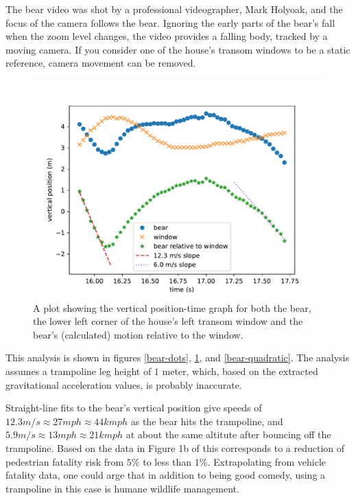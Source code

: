 \documentclass[12pt]{iopart}
\begin{document}
The bear video was shot by a professional videographer, Mark Holyoak, and the focus of the camera follows the bear.  Ignoring the early parts of the bear's fall when the zoom level changes, the video provides a falling body, tracked by a moving camera.  If you consider one of the house's transom windows to be a static reference, camera movement can be removed.

\begin{figure}[ht]
\centering
\includegraphics[width=\columnwidth]{figure_7_bear-speed.pdf}
\caption{
A plot showing the vertical position-time graph for both the bear, the lower left corner of the house's left transom window and the bear's (calculated)  motion relative to the window. 
}
\label{bear-speed}
\end{figure}

This analysis is shown in figures \ref{bear-dots}, \ref{bear-speed}, and \ref{bear-quadratic}.
The analysis assumes a trampoline leg height of $1$ meter, which, based on the extracted gravitational acceleration values, is probably inaccurate.
 
 Straight-line fits to the bear's vertical position give speeds of $12.3m/s\approx27mph\approx44kmph$ as the bear hits the trampoline, and $5.9m/s\approx13mph\approx21kmph$ at about the same altitute after bouncing off the trampoline.  Based on the data in Figure 1b of \cite{AccidentRisk} this corresponds to a reduction of pedestrian fatality risk from $5\%$ to less than $1\%$.  Extrapolating from vehicle fatality data, one could arge that in addition to being good comedy, using a trampoline in this case is humane wildlife management.     
 
\end{document}

